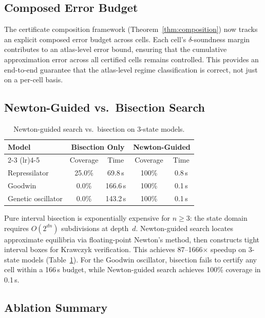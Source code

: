 \documentclass[11pt]{article}
\begin{document}
\subsection{Composed Error Budget}

The certificate composition framework (Theorem~\ref{thm:composition}) now tracks an explicit composed error budget across cells.
Each cell's $\delta$-soundness margin contributes to an atlas-level error bound, ensuring that the cumulative approximation error across all certified cells remains controlled.
This provides an end-to-end guarantee that the atlas-level regime classification is correct, not just on a per-cell basis.

\subsection{Newton-Guided vs.\ Bisection Search}

\begin{table}[t]
\centering
\caption{Newton-guided search vs.\ bisection on 3-state models.}
\label{tab:newton}
\small
\begin{tabular}{@{}lcccc@{}}
\toprule
Model & \multicolumn{2}{c}{Bisection Only} & \multicolumn{2}{c}{Newton-Guided} \\
\cmidrule(lr){2-3} \cmidrule(lr){4-5}
 & Coverage & Time & Coverage & Time \\
\midrule
Repressilator      & 25.0\% & 69.8\,s  & 100\% & 0.8\,s \\
Goodwin            & 0.0\%  & 166.6\,s & 100\% & 0.1\,s \\
Genetic oscillator & 0.0\%  & 143.2\,s & 100\% & 0.1\,s \\
\bottomrule
\end{tabular}
\end{table}

Pure interval bisection is exponentially expensive for $n \geq 3$: the state domain requires $O(2^{dn})$ subdivisions at depth~$d$.
Newton-guided search locates approximate equilibria via floating-point Newton's method, then constructs tight interval boxes for Krawczyk verification.
This achieves 87--1666$\times$ speedup on 3-state models (Table~\ref{tab:newton}).
For the Goodwin oscillator, bisection fails to certify any cell within a 166\,s budget, while Newton-guided search achieves 100\% coverage in 0.1\,s.

\subsection{Ablation Summary}
\end{document}

